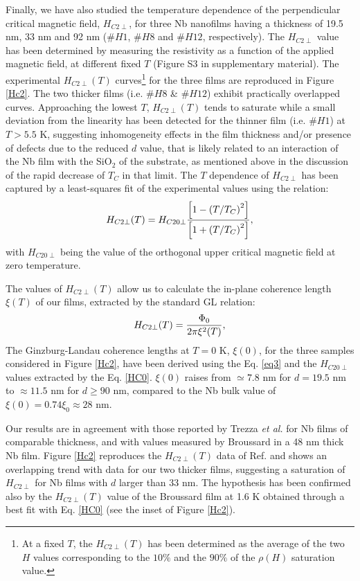 \documentclass[reprint,onecolumn,superscriptaddress,a4paper,nofootinbib,floatfix]{revtex4-1}
\begin{document}
Finally, we have also studied the temperature dependence of the perpendicular critical magnetic field, $H_{C2\perp}$, for three Nb nanofilms having a thickness of 19.5 nm, 33 nm and 92 nm ($\#H1$, $\#H8$ and $\#H12$, respectively). The $H_{C2\perp}$ value has been determined by measuring the resistivity as a function of the applied magnetic field, at different fixed $T$ (Figure S3 in supplementary material).
The experimental $H_{C2\perp}(T)$ curves\footnote{At a fixed $T$, the $H_{C2\perp}(T)$ has been determined as the average of the two $H$ values corresponding to the $10\%$ and the $90\%$ of the $\rho(H)$ saturation value.} for the three films are reproduced in Figure \ref{Hc2}. The two thicker films (i.e. $\#H8$ \& $\#H12$) exhibit practically overlapped curves. Approaching the lowest $T$, $H_{C2\perp}(T)$ tends to saturate while a small deviation from the linearity has been detected for the thinner film (i.e. $\#H1$) at $T > 5.5$ K, suggesting inhomogeneity effects in the film thickness and/or presence of defects due to the reduced $d$ value, that is likely related to an interaction of the Nb film with the SiO$_2$ of the substrate, as mentioned above in the discussion of the rapid decrease of $T_C$ in that limit. 
The $T$ dependence of $H_{C2\perp}$ has been captured by a least-squares fit of the experimental values using the relation:\cite{Bao2005}
\begin{equation}
\centering
H_{C2\perp}(T) = H_{C20\perp}\frac{\left[1-\left(T/T_C\right)^2\right]}{\left[1+\left(T/T_C\right)^2\right]},
\label{HC0}
\end{equation}
with $H_{C20\perp}$ being the value of the orthogonal upper critical magnetic field at zero temperature.

The values of $H_{C2\perp}(T)$ allow us to calculate the in-plane coherence length $\xi(T)$ of our films, extracted by the standard GL relation:\cite{Bao2005}
\begin{equation}
\centering
H_{C2\perp}(T) = \frac{\Phi_0}{2\pi\xi^2(T)},
\label{eq3}
\end{equation}
The Ginzburg-Landau coherence lengths at $T = 0$ K, $\xi(0)$, for the three samples considered in Figure \ref{Hc2}, have been derived using the Eq. \eqref{eq3} and the $H_{C20\perp}$ values extracted by the Eq. \eqref{HC0}. $\xi(0)$ raises from $\simeq 7.8$ nm for $d = 19.5$ nm to $\approx 11.5$ nm for $d \geq 90$ nm, compared to the Nb bulk value of $\xi(0) = 0.74\xi_0\approx28$ nm.

Our results are in agreement with those reported by Trezza \textit{et al.} for Nb films of comparable thickness,\cite{Trezza} and with values measured by Broussard in a 48 nm thick Nb film.\cite{Broussard} Figure \ref{Hc2} reproduces the $H_{C2\perp}(T)$ data of Ref. \cite{Broussard} and shows an overlapping trend with data for our two thicker films, suggesting a saturation of $H_{C2\perp}$ for Nb films with $d$ larger than 33 nm. The hypothesis has been confirmed also by the $H_{C2\perp}(T)$ value of the Broussard film at 1.6 K obtained through a best fit with Eq. \eqref{HC0} (see the inset of Figure \ref{Hc2}). 
\end{document}
